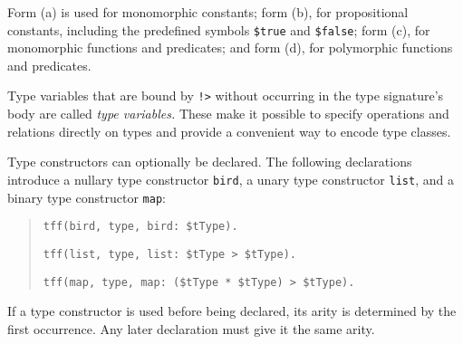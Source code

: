 Form (a) is used for monomorphic constants; form (b), for
propositional constants, including the predefined symbols {\tt \$true} and
{\tt \$false}; form (c), for monomorphic functions and predicates;
and form (d), for polymorphic functions and predicates.



Type variables that are bound by {\tt !>} without
occurring in the type signature's body are called \emph{\theghost{} type variables.}
These make it possible to specify operations and relations directly on types and
provide a convenient way to encode type classes.


\pagebreak[3] %

 Type constructors
can optionally be declared.
The following declarations introduce a nullary type
constructor {\tt bird}, a unary type constructor {\tt list},
and a binary type constructor {\tt map}:
\begin{quote}
\verb+tff(bird, type, bird: $tType).+
\par
\verb+tff(list, type, list: $tType > $tType).+
\par
\verb+tff(map, type, map: ($tType * $tType) > $tType).+
\end{quote}
If a type constructor is used before being declared, its arity is
determined by the first occurrence. Any later declaration
must give it the same arity.

